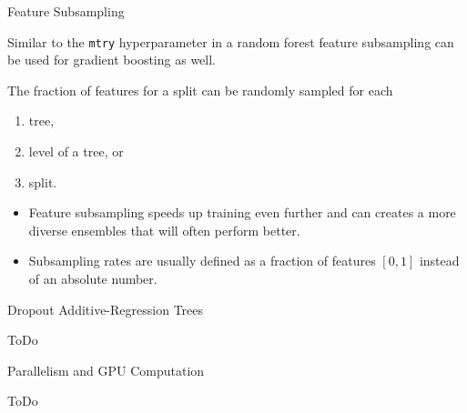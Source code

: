 \begin{vbframe}{Feature Subsampling}

Similar to the \texttt{mtry} hyperparameter in a random forest feature subsampling can be used for gradient boosting as well.

\lz

The fraction of features for a split can be randomly sampled for each


\begin{enumerate}
  \item tree,
  \item level of a tree, or
  \item split.
\end{enumerate}

\lz

\begin{itemize}
  \item Feature subsampling speeds up training even further and can creates a more diverse ensembles that will often perform better.
  \item Subsampling rates are usually defined as a fraction of features $[0,1]$ instead of an absolute number.
\end{itemize}


\end{vbframe}

\begin{vbframe}{Dropout Additive-Regression Trees}

ToDo

\end{vbframe}


\begin{vbframe}{Parallelism and GPU Computation}

ToDo

\end{vbframe}

